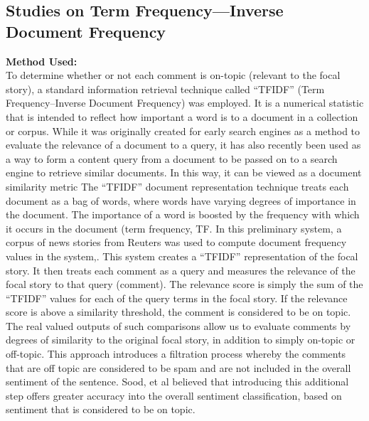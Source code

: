 \subsection{Studies on Term Frequency—Inverse Document Frequency}
\textbf{Method Used:}\\
To determine whether or not each comment is on-topic (relevant to the focal story), a standard
information retrieval technique called “TFIDF” (Term Frequency–Inverse Document Frequency)
was employed. It is a numerical statistic that is intended to reflect how important a word is to
a document in a collection or corpus. While it was originally created for early search engines as
a method to evaluate the relevance of a document to a query, it has also recently been used as
a way to form a content query from a document to be passed on to a search engine to retrieve similar documents. In this way, it can be viewed as a document similarity metric The “TFIDF”
document representation technique treats each document as a bag of words, where words have
varying degrees of importance in the document. The importance of a word is boosted by the
frequency with which it occurs in the document (term frequency, TF. In this preliminary
system, a corpus of news stories from Reuters was used to compute document frequency
values in the system,\cite{ref32}. This system creates a “TFIDF” representation of the focal
story. It then treats each comment as a query and measures the relevance of the focal story to that
query (comment). The relevance score is simply the sum of the “TFIDF” values for each of the
query terms in the focal story. If the relevance score is above a similarity threshold, the
comment is considered to be on topic. The real valued outputs of such comparisons allow us
to evaluate comments by degrees of similarity to the original focal story, in addition to simply on-topic or off-topic.
This approach introduces a filtration process whereby the comments that are off topic are
considered to be spam and are not included in the overall sentiment of the sentence. Sood, et al
believed that introducing this additional step offers greater accuracy into the overall sentiment
classification, based on sentiment that is considered to be on topic.

